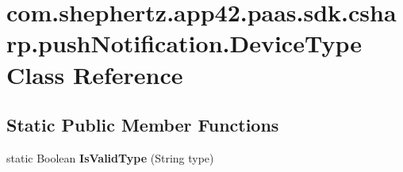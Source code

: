 \hypertarget{classcom_1_1shephertz_1_1app42_1_1paas_1_1sdk_1_1csharp_1_1push_notification_1_1_device_type}{\section{com.\+shephertz.\+app42.\+paas.\+sdk.\+csharp.\+push\+Notification.\+Device\+Type Class Reference}
\label{classcom_1_1shephertz_1_1app42_1_1paas_1_1sdk_1_1csharp_1_1push_notification_1_1_device_type}
}
\subsection*{Static Public Member Functions}
\begin{DoxyCompactItemize}
\item 
\hypertarget{classcom_1_1shephertz_1_1app42_1_1paas_1_1sdk_1_1csharp_1_1push_notification_1_1_device_type_ab7b80d86a5bd885c23bd78ece214360c}{static Boolean {\bfseries Is\+Valid\+Type} (String type)}\label{classcom_1_1shephertz_1_1app42_1_1paas_1_1sdk_1_1csharp_1_1push_notification_1_1_device_type_ab7b80d86a5bd885c23bd78ece214360c}

\end{DoxyCompactItemize}
